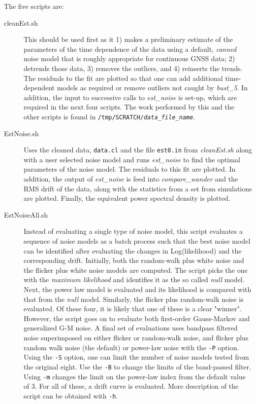 \documentclass[12pt]{amsart}
\begin{document}
The five scripts are:
\begin{description}
\item[cleanEst.sh] This should be used first as it 1) makes a preliminary estimate of the parameters of the time dependence of the 
data using a default, \textit{canned} noise model that is roughly appropriate for continuous GNSS data; 2) detrends those data, 3) removes the outliers, and 4) reinserts the trends. The residuals to the fit are plotted so that one can
add additional time-dependent models as required or remove outliers not caught by \textit{bust\_5}.   In addition, the input to successive calls to \textit{est\_noise} is set-up, which are required in the next four scripts. The work performed by this and the other scripts is
found in \texttt{/tmp/SCRATCH/\textit{data\_file\_name}}.
\item[EstNoise.sh]  Uses the cleaned data, \texttt{data.cl} and the file \texttt{est0.in} from \textit{cleanEst.sh} along with a user selected noise
model and runs \textit{est\_noise} to find the optimal parameters of the noise model.  The residuals to this fit are plotted.
In addition, the output of \textit{est\_noise} is feed into \textit{compare\_wander} and the RMS drift of the data, along with
the statistics from a set from simulations are plotted.  Finally, the equivalent power spectral density is plotted.
\item[EstNoiseAll.sh]  Instead of evaluating a single type of noise model, this script evaluates a sequence of noise models
as a batch process such that the best noise model can be identified after evaluating the changes in Log(likelihood) and
the corresponding drift.  Initially, both the random-walk plus white noise and the flicker plus white noise models are
computed.  The script picks the one with the \textit{maximum likelihood} and identifies it as the so called \textit{null} model.
Next, the power law model is evaluated and its likelihood is compared with that from the \textit{null} model. Similarly,
the flicker plus random-walk noise is evaluated. Of these four, it is likely that one of these is a clear "winner". However,
the script goes on to evaluate both first-order Gauss-Markov and generalized G-M noise. A final set of evaluations uses
bandpass filtered noise superimposed on either flicker or random-walk noise, and flicker plus random walk noise (the default) or power-law noise with the \texttt{-P} option.  Using the \texttt{-S} option,
one can limit the number of noise models tested from the original eight.  Use the \texttt{-B} to change the limits
of the band-passed filter. Using \texttt{-m} changes the limit on the power-law index from the default value of $3$. For all of these, a drift curve is evaluated. More description of the script can be obtained with \texttt{-h}.
\end{description}
\end{document}
